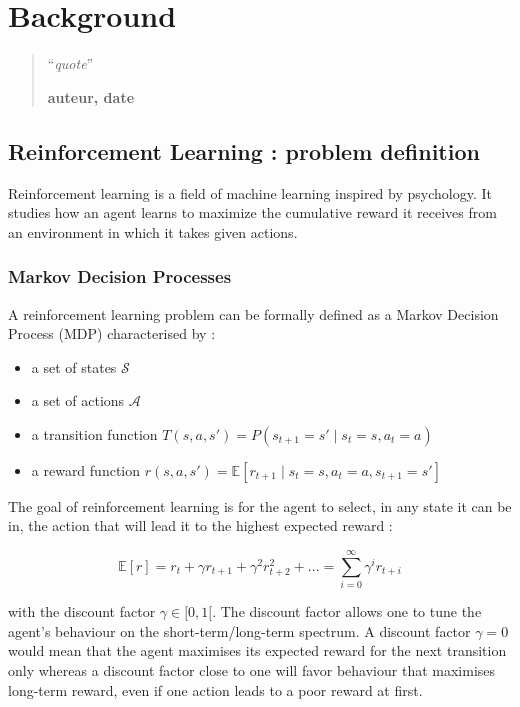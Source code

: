 \chapter{Background}
\begin{quotation}
\noindent ``\emph{quote}''
\begin{flushright}\textbf{auteur, date}\end{flushright}
\end{quotation}

\vspace*{0.5cm}

\section{Reinforcement Learning : problem definition}
Reinforcement learning is a field of machine learning inspired by psychology.
It studies how an agent learns to maximize the cumulative reward it receives
from an environment in which it takes given actions. 

\subsection{Markov Decision Processes}
A reinforcement learning problem can be formally defined as a Markov 
Decision Process (MDP)  characterised by :
\begin{itemize}
	\item a set of states $\mathcal{S}$
	\item a set of actions $\mathcal{A}$
	\item a transition function 
		$T(s, a, s') = P(s_{t+1} = s' \mid s_t = s, a_t = a)$
	\item a reward function 
		$r(s, a, s') = \mathbb{E}
		 [r_{t+1} \mid s_t = s, a_t = a, s_{t+1} = s']$
\end{itemize}

The goal of reinforcement learning is for the agent to select, in any state it
can be in, the action that will lead it to the highest expected reward :

\begin{equation}
\mathbb{E}[r] = r_t + \gamma r_{t+1} + \gamma^2 r_{t+2}^2 + ... =
 \sum\limits_{i=0}^\infty \gamma^i r_{t+i}
\end{equation}

\noindent with the discount factor  $\gamma \in [0, 1[$.
The discount factor allows one to tune the agent's behaviour on the
short-term/long-term spectrum. A discount factor $\gamma=0$ would mean that the
agent maximises its expected reward for the next transition only whereas a
discount factor close to one will favor behaviour that maximises long-term
reward, even if one action leads to a poor reward at first.\\

